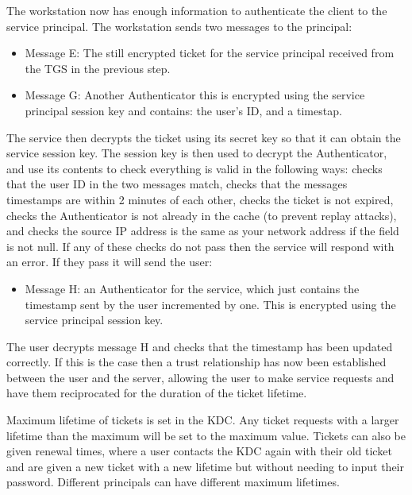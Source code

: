 \documentclass[]{report}   %
\begin{document}
The workstation now has enough information to authenticate the client to the service principal. The workstation sends two messages to the principal:
\begin{itemize}
\item Message E: The still encrypted ticket for the service principal received from the TGS in the previous step.
\item Message G: Another Authenticator this is encrypted using the service principal session key and contains: the user's ID, and a timestap.
\end{itemize}
The service then decrypts the ticket using its secret key so that it can obtain the service session key. The session key is then used to decrypt the Authenticator, and use its contents to check everything is valid in the following ways: checks that the user ID in the two messages match, checks that the messages timestamps are within 2 minutes of each other, checks the ticket is not expired, checks the Authenticator is not already in the cache (to prevent replay attacks), and checks the source IP address is the same as your network address if the field is not null. If any of these checks do not pass then the service will respond with an error. If they pass it will send the user:
\begin{itemize}
\item Message H: an Authenticator for the service, which just contains the timestamp sent by the user incremented by one. This is encrypted using the service principal session key.
\end{itemize}

The user decrypts message H and checks that the timestamp has been updated correctly. If this is the case then a trust relationship has now been established between the user and the server, allowing the user to make service requests and have them reciprocated for the duration of the ticket lifetime.

Maximum lifetime of tickets is set in the KDC. Any ticket requests with a larger lifetime than the maximum will be set to the maximum value. Tickets can also be given renewal times, where a user contacts the KDC again with their old ticket and are given a new ticket with a new lifetime but without needing to input their password. Different principals can have different maximum lifetimes.
\end{document}
